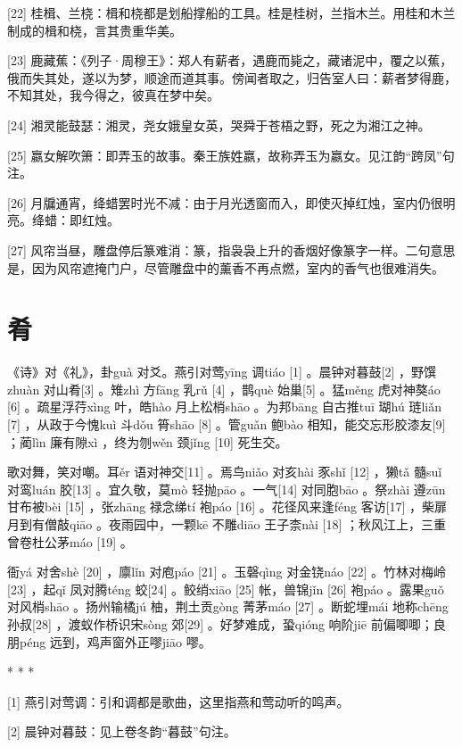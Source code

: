 \documentclass[12pt,UTF8]{ctexbook}
\begin{document}
[22] 桂楫、兰桡：楫和桡都是划船撑船的工具。桂是桂树，兰指木兰。用桂和木兰制成的楫和桡，言其贵重华美。

[23] 鹿藏蕉：《列子·周穆王》：郑人有薪者，遇鹿而毙之，藏诸泥中，覆之以蕉，俄而失其处，遂以为梦，顺途而道其事。傍闻者取之，归告室人曰：薪者梦得鹿，不知其处，我今得之，彼真在梦中矣。

[24] 湘灵能鼓瑟：湘灵，尧女娥皇女英，哭舜于苍梧之野，死之为湘江之神。

[25] 嬴女解吹箫：即弄玉的故事。秦王族姓嬴，故称弄玉为嬴女。见江韵“跨凤”句注。

[26] 月牖通宵，绛蜡罢时光不减：由于月光透窗而入，即使灭掉红烛，室内仍很明亮。绛蜡：即红烛。

[27] 风帘当昼，雕盘停后篆难消：篆，指袅袅上升的香烟好像篆字一样。二句意思是，因为风帘遮掩门户，尽管雕盘中的薰香不再点燃，室内的香气也很难消失。





\chapter{肴}


《诗》对《礼》，卦guà 对爻。燕引对莺yīng 调tiáo [1] 。晨钟对暮鼓[2] ，野馔zhuàn 对山肴[3] 。雉zhì 方fāng 乳rǔ [4] ，鹊què 始巢[5] 。猛měng 虎对神獒áo [6] 。疏星浮荇xìng 叶，皓hào 月上松梢shāo 。为邦bāng 自古推tuī 瑚hú 琏liǎn [7] ，从政于今愧kuì 斗dǒu 筲shāo [8] 。管guǎn 鲍bào 相知，能交忘形胶漆友[9] ；蔺lìn 廉有隙xì ，终为刎wěn 颈jǐng [10] 死生交。

歌对舞，笑对嘲。耳ěr 语对神交[11] 。焉鸟niǎo 对亥hài 豕shǐ [12] ，獭tǎ 髓suǐ 对鸾luán 胶[13] 。宜久敬，莫mò 轻抛pāo 。一气[14] 对同胞bāo 。祭zhài 遵zūn 甘布被bèi [15] ，张zhāng 禄念绨tí 袍páo [16] 。花径风来逢féng 客访[17] ，柴扉月到有僧敲qiāo 。夜雨园中，一颗kē 不雕diāo 王子柰nài [18] ；秋风江上，三重曾卷杜公茅máo [19] 。

衙yá 对舍shè [20] ，廪lǐn 对庖páo [21] 。玉磬qìng 对金铙náo [22] 。竹林对梅岭[23] ，起qǐ 凤对腾téng 蛟[24] 。鲛绡xiāo [25] 帐，兽锦jǐn [26] 袍páo 。露果guǒ 对风梢shāo 。扬州输橘jú 柚，荆土贡gòng 菁茅máo [27] 。断蛇埋mái 地称chēng 孙叔[28] ，渡蚁作桥识宋sòng 郊[29] 。好梦难成，蛩qióng 响阶jiē 前偏唧唧；良朋péng 远到，鸡声窗外正嘐jiāo 嘐。



* * *



[1] 燕引对莺调：引和调都是歌曲，这里指燕和莺动听的鸣声。

[2] 晨钟对暮鼓：见上卷冬韵“暮鼓”句注。
\end{document}
